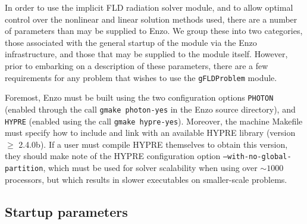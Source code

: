 \documentclass[letterpaper,10pt]{article}
\renewcommand{\(}{\left(}
\renewcommand{\)}{\right)}
\begin{document}
In order to use the implicit FLD radiation solver module, and to
allow optimal control over the nonlinear and linear solution methods
used, there are a number of parameters than may be supplied to Enzo.
We group these into two categories, those associated with the general
startup of the module via the Enzo infrastructure, and those that may
be supplied to the module itself.  However, prior to embarking on a
description of these parameters, there are a few requirements for any
problem that wishes to use the {\tt gFLDProblem} module.

Foremost, Enzo must be built using the two configuration options
{\tt PHOTON} (enabled through the call {\tt gmake photon-yes} in the
Enzo source directory), and {\tt HYPRE} (enabled using the call 
{\tt gmake hypre-yes}).  Moreover, the machine Makefile must specify
how to include and link with an available HYPRE library (version $\ge$
2.4.0b).  If a user must compile HYPRE themselves to obtain this
version, they should make note of the HYPRE configuration option
{\tt --with-no-global-partition}, which must be used for solver
scalability when using over $\sim1000$ processors, but which results
in slower executables on smaller-scale problems.


\subsection{Startup parameters}
\end{document}
